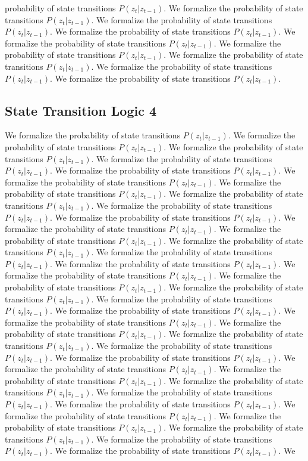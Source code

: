 probability of state transitions $P(z_t | z_{t-1})$. We formalize the probability of state transitions $P(z_t | z_{t-1})$. We formalize the probability of state transitions $P(z_t | z_{t-1})$. We formalize the probability of state transitions $P(z_t | z_{t-1})$. We formalize the probability of state transitions $P(z_t | z_{t-1})$. We formalize the probability of state transitions $P(z_t | z_{t-1})$. We formalize the probability of state transitions $P(z_t | z_{t-1})$. We formalize the probability of state transitions $P(z_t | z_{t-1})$. We formalize the probability of state transitions $P(z_t | z_{t-1})$. 

\subsection{State Transition Logic 4}
We formalize the probability of state transitions $P(z_t | z_{t-1})$. We formalize the probability of state transitions $P(z_t | z_{t-1})$. We formalize the probability of state transitions $P(z_t | z_{t-1})$. We formalize the probability of state transitions $P(z_t | z_{t-1})$. We formalize the probability of state transitions $P(z_t | z_{t-1})$. We formalize the probability of state transitions $P(z_t | z_{t-1})$. We formalize the probability of state transitions $P(z_t | z_{t-1})$. We formalize the probability of state transitions $P(z_t | z_{t-1})$. We formalize the probability of state transitions $P(z_t | z_{t-1})$. We formalize the probability of state transitions $P(z_t | z_{t-1})$. We formalize the probability of state transitions $P(z_t | z_{t-1})$. We formalize the probability of state transitions $P(z_t | z_{t-1})$. We formalize the probability of state transitions $P(z_t | z_{t-1})$. We formalize the probability of state transitions $P(z_t | z_{t-1})$. We formalize the probability of state transitions $P(z_t | z_{t-1})$. We formalize the probability of state transitions $P(z_t | z_{t-1})$. We formalize the probability of state transitions $P(z_t | z_{t-1})$. We formalize the probability of state transitions $P(z_t | z_{t-1})$. We formalize the probability of state transitions $P(z_t | z_{t-1})$. We formalize the probability of state transitions $P(z_t | z_{t-1})$. We formalize the probability of state transitions $P(z_t | z_{t-1})$. We formalize the probability of state transitions $P(z_t | z_{t-1})$. We formalize the probability of state transitions $P(z_t | z_{t-1})$. We formalize the probability of state transitions $P(z_t | z_{t-1})$. We formalize the probability of state transitions $P(z_t | z_{t-1})$. We formalize the probability of state transitions $P(z_t | z_{t-1})$. We formalize the probability of state transitions $P(z_t | z_{t-1})$. We formalize the probability of state transitions $P(z_t | z_{t-1})$. We formalize the probability of state transitions $P(z_t | z_{t-1})$. We formalize the probability of state transitions $P(z_t | z_{t-1})$. We formalize the probability of state transitions $P(z_t | z_{t-1})$. We formalize the probability of state transitions $P(z_t | z_{t-1})$. We formalize the probability of state transitions $P(z_t | z_{t-1})$. We formalize the probability of state transitions $P(z_t | z_{t-1})$. We formalize the probability of state transitions $P(z_t | z_{t-1})$. We 